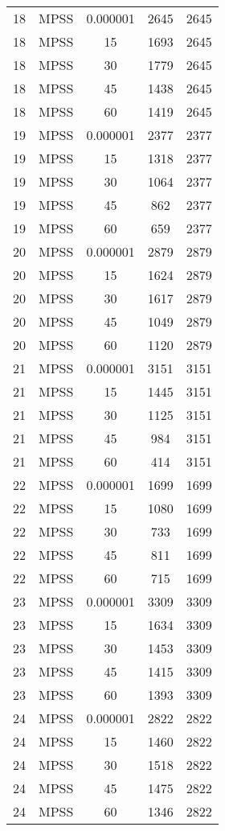\begin{center}
\begin{longtable}{ccccc}
18	&	MPSS	&	0.000001	&	2645	&	2645	\\
18	&	MPSS	&	15	&	1693	&	2645	\\
18	&	MPSS	&	30	&	1779	&	2645	\\
18	&	MPSS	&	45	&	1438	&	2645	\\
18	&	MPSS	&	60	&	1419	&	2645	\\
19	&	MPSS	&	0.000001	&	2377	&	2377	\\
19	&	MPSS	&	15	&	1318	&	2377	\\
19	&	MPSS	&	30	&	1064	&	2377	\\
19	&	MPSS	&	45	&	862	&	2377	\\
19	&	MPSS	&	60	&	659	&	2377	\\
20	&	MPSS	&	0.000001	&	2879	&	2879	\\
20	&	MPSS	&	15	&	1624	&	2879	\\
20	&	MPSS	&	30	&	1617	&	2879	\\
20	&	MPSS	&	45	&	1049	&	2879	\\
20	&	MPSS	&	60	&	1120	&	2879	\\
21	&	MPSS	&	0.000001	&	3151	&	3151	\\
21	&	MPSS	&	15	&	1445	&	3151	\\
21	&	MPSS	&	30	&	1125	&	3151	\\
21	&	MPSS	&	45	&	984	&	3151	\\
21	&	MPSS	&	60	&	414	&	3151	\\
22	&	MPSS	&	0.000001	&	1699	&	1699	\\
22	&	MPSS	&	15	&	1080	&	1699	\\
22	&	MPSS	&	30	&	733	&	1699	\\
22	&	MPSS	&	45	&	811	&	1699	\\
22	&	MPSS	&	60	&	715	&	1699	\\
23	&	MPSS	&	0.000001	&	3309	&	3309	\\
23	&	MPSS	&	15	&	1634	&	3309	\\
23	&	MPSS	&	30	&	1453	&	3309	\\
23	&	MPSS	&	45	&	1415	&	3309	\\
23	&	MPSS	&	60	&	1393	&	3309	\\
24	&	MPSS	&	0.000001	&	2822	&	2822	\\
24	&	MPSS	&	15	&	1460	&	2822	\\
24	&	MPSS	&	30	&	1518	&	2822	\\
24	&	MPSS	&	45	&	1475	&	2822	\\
24	&	MPSS	&	60	&	1346	&	2822	\\
\end{longtable}    
\end{center}









